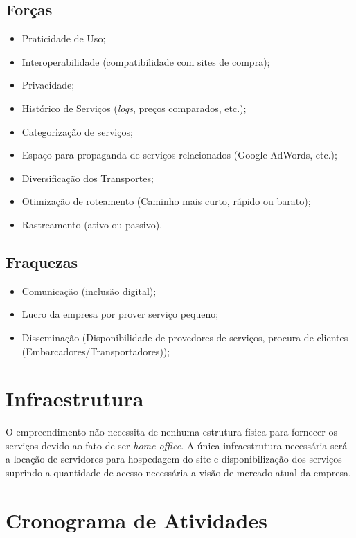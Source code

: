 	\subsection{Forças}
		\begin{itemize}
			\item Praticidade de Uso;
			\item Interoperabilidade (compatibilidade com sites de compra);
			\item Privacidade;
			\item Histórico de Serviços (\textit{logs}, preços comparados, etc.);
			\item Categorização de serviços;
			\item Espaço para propaganda de serviços relacionados (Google AdWords, etc.);
			\item Diversificação dos Transportes;
			\item Otimização de roteamento (Caminho mais curto, rápido ou barato);
			\item Rastreamento (ativo ou passivo).
		\end{itemize}
		
		
	\subsection{Fraquezas}
		\begin{itemize}
			\item Comunicação (inclusão digital);
			\item Lucro da empresa por prover serviço pequeno;
			\item Disseminação (Disponibilidade de provedores de serviços, procura de clientes (Embarcadores/Transportadores));
		\end{itemize}
		
	
	\section{Infraestrutura}
		
		O empreendimento não necessita de nenhuma estrutura física para fornecer os serviços devido ao fato de ser \textit{home-office}. A única infraestrutura necessária será a locação de servidores para hospedagem do site e disponibilização dos serviços suprindo a quantidade de acesso necessária a visão de mercado atual da empresa.
	
	\section{Cronograma de Atividades}
	
